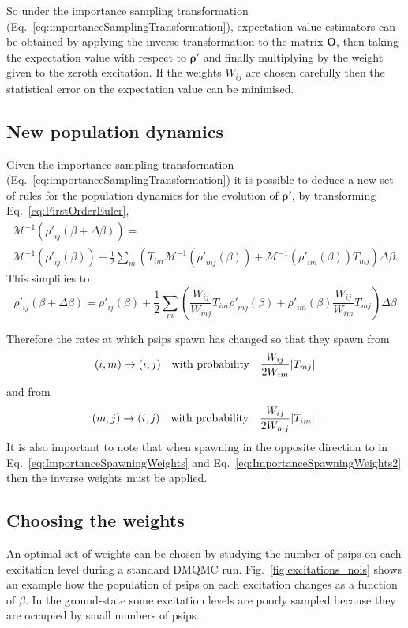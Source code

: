 So under the importance sampling transformation (Eq.~\ref{eq:importanceSamplingTransformation}), expectation value estimators can be obtained by applying the inverse transformation to the matrix $\bm{O}$, then taking the expectation value with respect to $\bm{\rho}'$ and finally multiplying by the weight given to the zeroth excitation. If the weights $W_{ij}$ are chosen carefully then the statistical error on the expectation value can be minimised.

\subsection{New population dynamics}

Given the importance sampling transformation (Eq.~\ref{eq:importanceSamplingTransformation}) it is possible to deduce a new set of rules for the population dynamics for the evolution of $\bm{\rho}'$, by transforming Eq.~\ref{eq:FirstOrderEuler},
\begin{multline}
\mathcal{M}^{-1}({\rho'}_{ij}(\beta +\Delta \beta)) = \\ \mathcal{M}^{-1}({\rho'}_{ij}(\beta))+\frac{1}{2}\sum_{m}\left(T_{im}\mathcal{M}^{-1}({\rho'}_{mj}(\beta))+\mathcal{M}^{-1}({\rho'}_{im}(\beta))T_{mj}\right)\Delta\beta.
\end{multline}
This simplifies to
\begin{equation}
{\rho'}_{ij}(\beta +\Delta \beta) = {\rho'}_{ij}(\beta)+\frac{1}{2}\sum_{m}\left(\frac{W_{ij}}{W_{mj}}T_{im}{\rho'}_{mj}(\beta)+{\rho'}_{im}(\beta)\frac{W_{ij}}{W_{im}}T_{mj}\right)\Delta\beta
\end{equation}

Therefore the rates at which psips spawn has changed so that they spawn from
\begin{equation}
\label{eq:ImportanceSpawningWeights}
(i,m)\to(i,j) \textnormal{\phantom{---}with probability\phantom{---}} \frac{W_{ij}}{2W_{im}}\lvert T_{mj} \rvert
\end{equation}
and from
\begin{equation}
\label{eq:ImportanceSpawningWeights2}
(m,j)\to(i,j) \textnormal{\phantom{---}with probability\phantom{---}} \frac{W_{ij}}{2W_{mj}}\lvert T_{im} \rvert.
\end{equation}
It is also important to note that when spawning in the opposite direction to in Eq.~\ref{eq:ImportanceSpawningWeights} and Eq.~\ref{eq:ImportanceSpawningWeights2} then the inverse weights must be applied.


\subsection{Choosing the weights}
An optimal set of weights can be chosen by studying the number of psips on each excitation level during a standard DMQMC run. Fig.~\ref{fig:excitations_nois} shows an example how the population of psips on each excitation changes as a function of $\beta$. In the ground-state some excitation levels are poorly sampled because they are occupied by small numbers of psips. 

